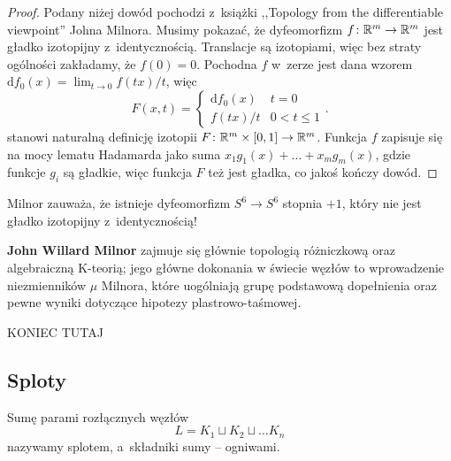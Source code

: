 \begin{proof}
    Podany niżej dowód pochodzi z~książki ,,Topology from the differentiable viewpoint'' Johna Milnora.
%
    Musimy pokazać, że dyfeomorfizm $f \colon \mathbb R^m \to \mathbb R^m$ jest gładko izotopijny z~identycznością.
    Translacje są izotopiami, więc bez straty ogólności zakładamy, że $f(0) = 0$.
    Pochodna $f$ w~zerze jest dana wzorem $\mathrm{d}f_0(x) = \lim_{t \to 0} f(tx) /t$, więc
    \begin{equation}
        F(x, t) = \begin{cases}
            \mathrm{d}f_0(x) & t = 0 \\
            f(tx) / t & 0 < t \le 1
        \end{cases} .
    \end{equation}
    stanowi naturalną definicję izotopii $F \colon \mathbb R^m \times [0, 1] \to \mathbb R^m$.
    Funkcja $f$ zapisuje się na mocy lematu Hadamarda jako suma $x_1 g_1(x) + \ldots + x_mg_m(x)$, gdzie funkcje $g_i$ są gładkie, więc funkcja $F$ też jest gładka, co jakoś kończy dowód.
%    
\end{proof}

Milnor zauważa, że istnieje dyfeomorfizm $S^6 \to S^6$ stopnia $+1$, który nie jest gładko izotopijny z~identycznością!
%

\begin{remark}
    \textbf{John Willard Milnor} zajmuje się głównie topologią różniczkową oraz algebraiczną K-teorią; jego główne dokonania w świecie węzłów to wprowadzenie niezmienników $\mu$ Milnora, które uogólniają grupę podstawową dopełnienia oraz pewne wyniki dotyczące hipotezy plastrowo-taśmowej.
\end{remark}
%
%
%

{\Huge \color{red} KONIEC TUTAJ}

\subsection{Sploty}
\begin{definition}
%
    Sumę parami rozłącznych węzłów
    \begin{equation}
        L = K_1 \sqcup K_2 \sqcup \ldots K_n
    \end{equation}
    nazywamy splotem, a~składniki sumy -- ogniwami.
\end{definition}

